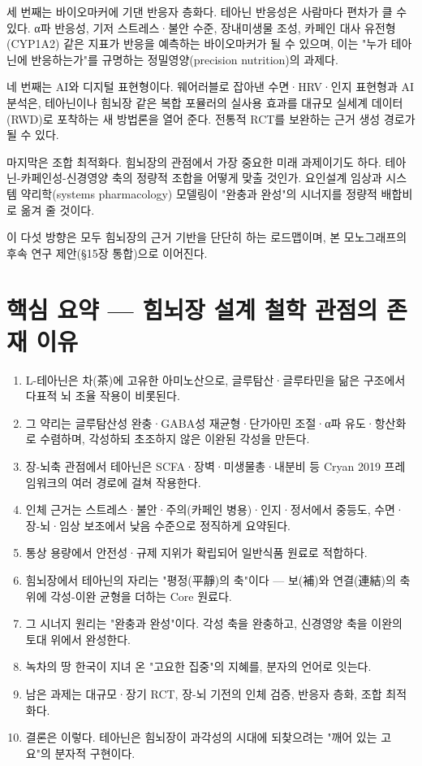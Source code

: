 \documentclass[12pt,oneside]{book}
\begin{document}
세 번째는 바이오마커에 기댄 반응자 층화다. 테아닌 반응성은 사람마다 편차가 클 수 있다. α파 반응성, 기저 스트레스·불안 수준, 장내미생물 조성, 카페인 대사 유전형(CYP1A2) 같은 지표가 반응을 예측하는 바이오마커가 될 수 있으며, 이는 "누가 테아닌에 반응하는가"를 규명하는 정밀영양(precision nutrition)의 과제다.

네 번째는 AI와 디지털 표현형이다. 웨어러블로 잡아낸 수면·HRV·인지 표현형과 AI 분석은, 테아닌이나 힘뇌장 같은 복합 포뮬러의 실사용 효과를 대규모 실세계 데이터(RWD)로 포착하는 새 방법론을 열어 준다. 전통적 RCT를 보완하는 근거 생성 경로가 될 수 있다.

마지막은 조합 최적화다. 힘뇌장의 관점에서 가장 중요한 미래 과제이기도 하다. 테아닌-카페인성-신경영양 축의 정량적 조합을 어떻게 맞출 것인가. 요인설계 임상과 시스템 약리학(systems pharmacology) 모델링이 "완충과 완성"의 시너지를 정량적 배합비로 옮겨 줄 것이다.

이 다섯 방향은 모두 힘뇌장의 근거 기반을 단단히 하는 로드맵이며, 본 모노그래프의 후속 연구 제안(§15장 통합)으로 이어진다.

\section{핵심 요약 — 힘뇌장 설계 철학 관점의 존재 이유}

\begin{enumerate}[leftmargin=6mm,itemsep=1pt,topsep=2pt]
  \item L-테아닌은 차(茶)에 고유한 아미노산으로, 글루탐산·글루타민을 닮은 구조에서 다표적 뇌 조율 작용이 비롯된다.
  \item 그 약리는 글루탐산성 완충·GABA성 재균형·단가아민 조절·α파 유도·항산화로 수렴하며, 각성하되 초조하지 않은 이완된 각성을 만든다.
  \item 장-뇌축 관점에서 테아닌은 SCFA·장벽·미생물총·내분비 등 Cryan 2019 프레임워크의 여러 경로에 걸쳐 작용한다.
  \item 인체 근거는 스트레스·불안·주의(카페인 병용)·인지·정서에서 중등도, 수면·장-뇌·임상 보조에서 낮음 수준으로 정직하게 요약된다.
  \item 통상 용량에서 안전성·규제 지위가 확립되어 일반식품 원료로 적합하다.
  \item 힘뇌장에서 테아닌의 자리는 "평정(平靜)의 축"이다 — 보(補)와 연결(連結)의 축 위에 각성-이완 균형을 더하는 Core 원료다.
  \item 그 시너지 원리는 "완충과 완성"이다. 각성 축을 완충하고, 신경영양 축을 이완의 토대 위에서 완성한다.
  \item 녹차의 땅 한국이 지녀 온 "고요한 집중"의 지혜를, 분자의 언어로 잇는다.
  \item 남은 과제는 대규모·장기 RCT, 장-뇌 기전의 인체 검증, 반응자 층화, 조합 최적화다.
  \item 결론은 이렇다. 테아닌은 힘뇌장이 과각성의 시대에 되찾으려는 "깨어 있는 고요"의 분자적 구현이다.
\end{enumerate}
\end{document}
